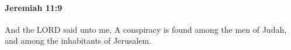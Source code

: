 
		\paragraph{Jeremiah 11:9} %
			\label{JEREMIAH-11-9}

			And the LORD said unto me, A conspiracy is found among the men of Judah, and among the inhabitants of Jerusalem.


